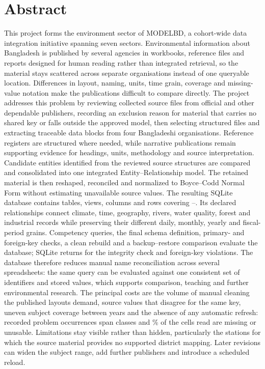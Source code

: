 \section*{Abstract}
\label{sec:abstract}

This project forms the environment sector of MODELBD, a cohort-wide data
integration initiative spanning seven sectors. Environmental information about
Bangladesh is published by several agencies in workbooks, reference files and
reports designed for human reading rather than integrated retrieval, so the
material stays scattered across separate organisations instead of one queryable
location. Differences in layout, naming, units, time grain, coverage and
missing-value notation make the publications difficult to compare directly. The
project addresses this problem by reviewing \mSourceDataFiles{} collected source
files from official and other dependable publishers, recording an exclusion
reason for material that carries no shared key or falls outside the approved
model, then selecting \mSourceFiles{} structured files and extracting
\mSourceBlocks{} traceable data blocks from four Bangladeshi organisations.
Reference registers are structured where needed, while narrative publications
remain supporting evidence for headings, units, methodology and source
interpretation. Candidate entities
identified from the reviewed source structures are compared and consolidated
into one integrated Entity--Relationship model. The retained material is then
reshaped, reconciled
and normalized to Boyce--Codd Normal Form without estimating unavailable source
values. The resulting SQLite database contains \mDbTables{} tables,
\mDbViews{} views, \mDbColumns{} columns and \mDbRows{} rows covering
\mYearMin--\mYearMax. Its declared relationships connect climate, time,
geography, rivers, water quality, forest and industrial records while preserving
their different daily, monthly, yearly and fiscal-period grains. Competency
queries, the final schema definition, primary- and foreign-key checks, a clean
rebuild and a backup--restore comparison evaluate the database; SQLite returns
\texttt{\mDbIntegrity} for the integrity check and \mDbFkViolations{}
foreign-key violations. The database therefore reduces manual name
reconciliation across several spreadsheets: the same query can be evaluated
against one consistent set of identifiers and stored values, which supports
comparison, teaching and further environmental research.
The principal costs are the volume of manual cleaning the published layouts
demand, source values that disagree for the same key, uneven subject coverage
between years and the absence of any automatic refresh: \mProblemTotal{}
recorded problem occurrences span \mProblemClasses{} classes and
\mCellsMissingPct\% of the cells read are missing or unusable. Limitations stay
visible rather than hidden, particularly the \mUnmappedStations{} stations for
which the source material provides no supported district mapping. Later
revisions can widen the subject range, add further publishers and introduce a
scheduled reload.
